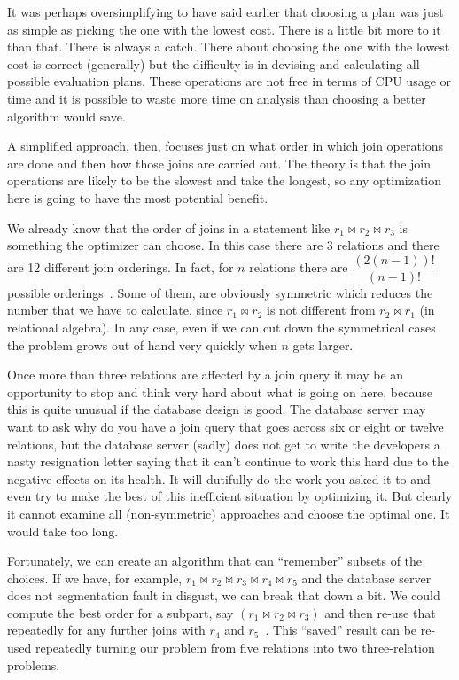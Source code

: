 It was perhaps oversimplifying to have said earlier that choosing a plan was just as simple as picking the one with the lowest cost. There is a little bit more to it than that. There is always a catch. There about choosing the one with the lowest cost is correct (generally) but the difficulty is in devising and calculating all possible evaluation plans. These operations are not free in terms of CPU usage or time and it is possible to waste more time on analysis than choosing a better algorithm would save. 

A simplified approach, then, focuses just on what order in which join operations are done and then how those joins are carried out. The theory is that the join operations are likely to be the slowest and take the longest, so any optimization here is going to have the most potential benefit.

We already know that the order of joins in a statement like $r_{1} \bowtie r_{2} \bowtie r_{3}$ is something the optimizer can choose. In this case there are 3 relations and there are 12 different join orderings. In fact, for $n$ relations there are $\dfrac{(2(n-1))!}{(n-1)!}$ possible orderings~\cite{dsc}. Some of them, are obviously symmetric which reduces the number that we have to calculate, since $r_{1} \bowtie r_{2}$ is not different from $r_{2} \bowtie r_{1}$ (in relational algebra). In any case, even if we can cut down the symmetrical cases the problem grows out of hand very quickly when $n$ gets larger. 

Once more than three relations are affected by a join query it may be an opportunity to stop and think very hard about what is going on here, because this is quite unusual if the database design is good. The database server may want to ask why do you have a join query that goes across six or eight or twelve relations, but the database server (sadly) does not get to write the developers a nasty resignation letter saying that it can't continue to work this hard due to the negative effects on its health. It will dutifully do the work you asked it to and even try to make the best of this inefficient situation by optimizing it. But clearly it cannot examine all (non-symmetric) approaches and choose the optimal one. It would take too long.

Fortunately, we can create an algorithm that can ``remember'' subsets of the choices. If we have, for example, $r_{1} \bowtie r_{2} \bowtie r_{3} \bowtie r_{4} \bowtie r_{5}$ and the database server does not segmentation fault in disgust, we can break that down a bit. We could compute the best order for a subpart, say $(r_{1} \bowtie r_{2} \bowtie r_{3})$ and then re-use that repeatedly for any further joins with $r_{4}$ and $r_{5}$~\cite{dsc}. This ``saved'' result can be re-used repeatedly turning our problem from five relations into two three-relation problems.

